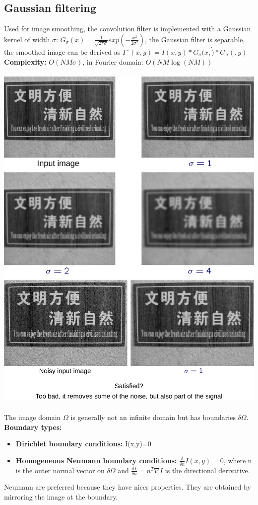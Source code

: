 \documentclass{article}
\begin{document}
\subsection{Gaussian filtering}
Used for image smoothing, the convolution filter is implemented with a Gaussian kernel of width $\sigma$: $G_\sigma(x)=\frac{1}{\sqrt{2\pi\sigma}}exp(-\frac{x^2}{2\sigma^2})$, the Gaussian filter is separable, the smoothed image can be derived as $I^{\sim}(x,y)=I(x,y)*G_\sigma(x,\dot)*G_\sigma(\dot,y)$\\
\textbf{Complexity: }$O(NM\sigma)$, in Fourier domain: $O(NM\log(NM))$\\\\
\includegraphics[scale=0.2]{20.png}
\includegraphics[scale=0.2]{21.png}\\\\
The image domain $\Omega$ is generally not an infinite domain but has boundaries $\delta\Omega$.\\
\textbf{Boundary types: }
\begin{itemize}
    \item \textbf{Dirichlet boundary conditions:} I(x,y)=0
    \item \textbf{Homogeneous Neumann boundary conditions:} $\frac{\delta}{\delta n} I(x,y)=0$, where n is the outer normal vector on $\delta\Omega$ and $\frac{\delta I}{\delta n}= n^T\nabla I$ is the directional derivative. 
\end{itemize}
Neumann are preferred because they have nicer properties. They are obtained by mirroring the image at the boundary.\\
\end{document}
